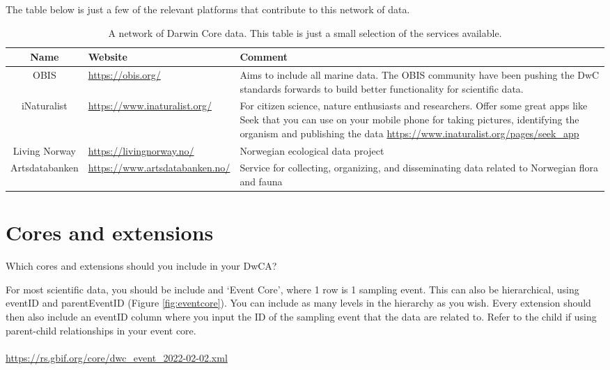 \documentclass[a4paper,english, 11pt]{article}
\begin{document}
The table below is just a few of the relevant platforms that contribute to this network of data.

\begin{table}[h!]
\centering
\caption{A network of Darwin Core data. This table is just a small selection of the services available.}
\begin{tabular}{cp{6cm}p{6.5cm}}
\toprule
Name & Website       & Comment  \\
\midrule
OBIS       & \url{https://obis.org/} & Aims to include all marine data. The OBIS community have been pushing the DwC standards forwards to build better functionality for scientific data.      \\
iNaturalist       & \url{https://www.inaturalist.org/} & For citizen science, nature enthusiasts and researchers. Offer some great apps like Seek that you can use on your mobile phone for taking pictures, identifying the organism and publishing the data \url{https://www.inaturalist.org/pages/seek_app}     \\
Living Norway     & \url{https://livingnorway.no/} & Norwegian ecological data project     \\
Artsdatabanken  & \url{https://www.artsdatabanken.no/} &  Service for collecting, organizing, and disseminating data related to Norwegian flora and fauna \\
\bottomrule
\end{tabular}
\end{table} 

\section{Cores and extensions}
\label{s:cores and extensions}

Which cores and extensions should you include in your DwCA? 

For most scientific data, you should be include and `Event Core', where 1 row is 1 sampling event. This can also be hierarchical, using eventID and parentEventID (Figure \ref{fig:eventcore}). You can include as many levels in the hierarchy as you wish. Every extension should then also include an eventID column where you input the ID of the sampling event that the data are related to. Refer to the child if using parent-child relationships in your event core.
\\
\\
\url{https://rs.gbif.org/core/dwc_event_2022-02-02.xml}
\end{document}
